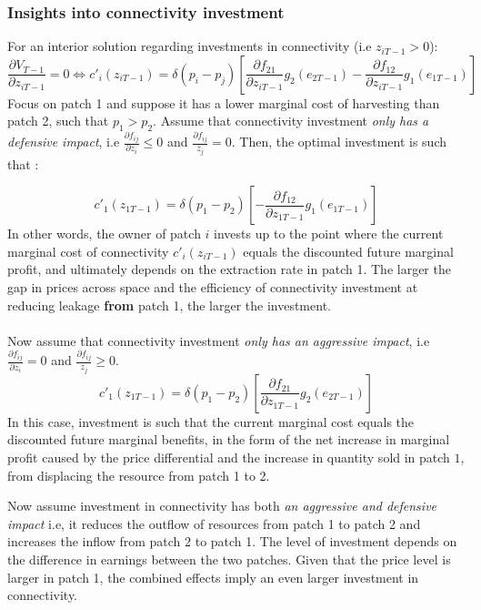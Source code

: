 \documentclass{article}
\begin{document}
\subsubsection{Insights into connectivity investment}
For an interior solution regarding investments in connectivity (i.e $z_{iT-1}>0$):
\begin{equation}
    \frac{\partial V_{T-1}}{\partial z_{iT-1}}= 0 \iff c'_i(z_{iT-1}) = \delta (p_i - p_j)\left[
    \frac{\partial f_{21}}{\partial z_{iT-1}} g_2(e_{2T-1}) - \frac{\partial f_{12}}{\partial z_{iT-1}}g_1(e_{1T-1})
    \right]
    \label{eq:z_t}
\end{equation}
Focus on patch 1 and suppose it has a lower marginal cost of harvesting than patch 2, such that $p_1 > p_2$.
Assume that connectivity investment \textit{only has a defensive impact}, i.e $\frac{\partial f_{ij}}{\partial z_i}\leq 0$ and $\frac{\partial f_{ij}}{z_j}=0$. Then, the optimal investment is such that :

$$
c'_1(z_{1T-1}) = \delta (p_1 - p_2)\left[ - \frac{\partial f_{12}}{\partial z_{1T-1}}g_1(e_{1T-1})
    \right]
$$
In other words, the owner of patch $i$ invests up to the point where the current marginal cost of connectivity $c'_i(z_{iT-1})$ equals the discounted future marginal profit, and ultimately depends on the extraction rate in patch 1. The larger the gap in prices across space and the efficiency of connectivity investment at reducing leakage \textbf{from} patch 1, the larger the investment. 
\\\\
Now assume that connectivity investment \textit{only has an aggressive impact}, i.e $\frac{\partial f_{ij}}{\partial z_i} =  0$ and $\frac{\partial f_{ij}}{z_j}\geq 0$. 
$$
c'_1(z_{1T-1}) = \delta (p_1 - p_2)\left[ \frac{\partial f_{21}}{\partial z_{1T-1}}g_2(e_{2T-1})
    \right]
$$
In this case, investment is such that the current marginal cost equals the discounted future marginal benefits, in the form of the net increase in marginal profit caused by the price differential and the increase in quantity sold in patch $1$, from displacing the resource from patch 1 to 2. 

Now assume investment in connectivity has both \textit{an aggressive and defensive impact} i.e, it reduces the outflow of resources from patch 1 to patch 2 and increases the inflow from patch 2 to patch 1. The level of investment depends on the difference in earnings between the two patches. Given that the price level is larger in patch 1, the combined effects imply an even larger investment in connectivity. 
\end{document}
